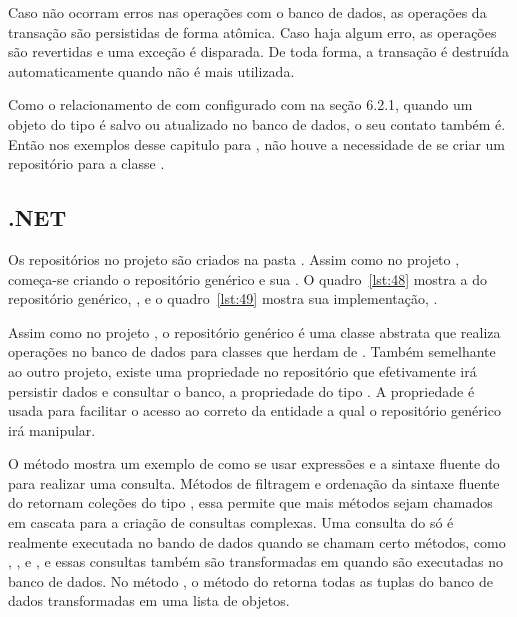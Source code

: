 Caso não ocorram erros nas operações com o banco de dados, as operações da transação são persistidas de forma atômica. Caso haja algum erro, as operações são revertidas e uma exceção é disparada. De toda forma, a transação é destruída automaticamente quando não é mais utilizada.

Como o relacionamento de  com  configurado com  na seção 6.2.1, quando um objeto do tipo  é salvo ou atualizado no banco de dados, o seu contato também é. Então nos exemplos desse capitulo para , não houve a necessidade de se criar um repositório para a classe .

\subsection{.NET}

Os repositórios no projeto  são criados na pasta . Assim como no projeto , começa-se criando o repositório genérico e sua . O quadro~\ref{lst:48} mostra a  do repositório genérico, , e o quadro~\ref{lst:49} mostra sua implementação, .



Assim como no projeto , o repositório genérico é uma classe abstrata que realiza operações no banco de dados para classes que herdam de . Também semelhante ao outro projeto, existe uma propriedade no repositório que efetivamente irá persistir dados e consultar o banco, a propriedade  do tipo . A propriedade  é usada para facilitar o acesso ao  correto da entidade a qual o repositório genérico irá manipular.

O método  mostra um exemplo de como se usar expressões  e a sintaxe fluente do  para realizar uma consulta. Métodos de filtragem e ordenação da sintaxe fluente do  retornam coleções do tipo , essa  permite que mais métodos sejam chamados em cascata para a criação de consultas complexas. Uma consulta do  só é realmente executada no bando de dados quando se chamam certo métodos, como , ,  e , e essas consultas também são transformadas em   quando são executadas no banco de dados. No método , o método  do  retorna todas as tuplas do banco de dados transformadas em uma lista de objetos.

